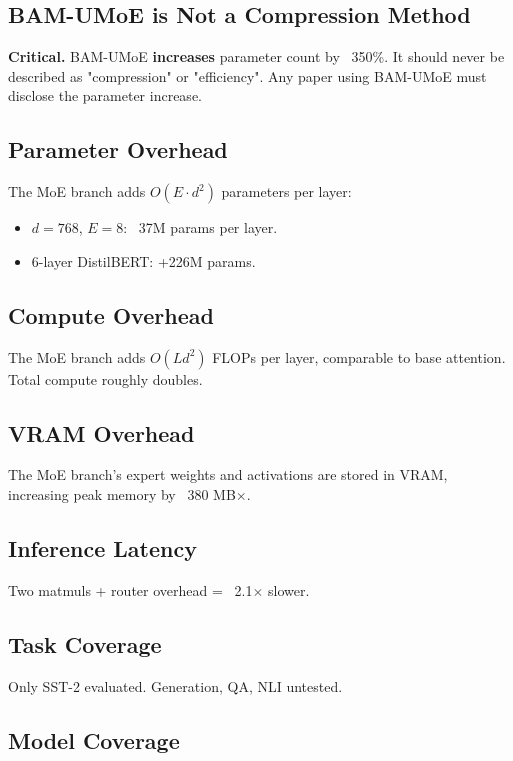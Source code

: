 \subsection{BAM-UMoE is Not a Compression Method}

\textbf{Critical.} BAM-UMoE \textbf{increases} parameter count by ~350\%. 
It should never be described as "compression" or "efficiency". Any paper 
using BAM-UMoE must disclose the parameter increase.

\subsection{Parameter Overhead}

The MoE branch adds $O(E \cdot d^2)$ parameters per layer:
\begin{itemize}
\item $d = 768$, $E = 8$: ~37M params per layer.
\item 6-layer DistilBERT: +226M params.

\end{itemize}
\subsection{Compute Overhead}

The MoE branch adds $O(L d^2)$ FLOPs per layer, comparable to base 
attention. Total compute roughly doubles.

\subsection{VRAM Overhead}

The MoE branch's expert weights and activations are stored in VRAM, 
increasing peak memory by ~380 MB$\times$.

\subsection{Inference Latency}

Two matmuls + router overhead = ~2.1$\times$ slower.

\subsection{Task Coverage}

Only SST-2 evaluated. Generation, QA, NLI untested.

\subsection{Model Coverage}

